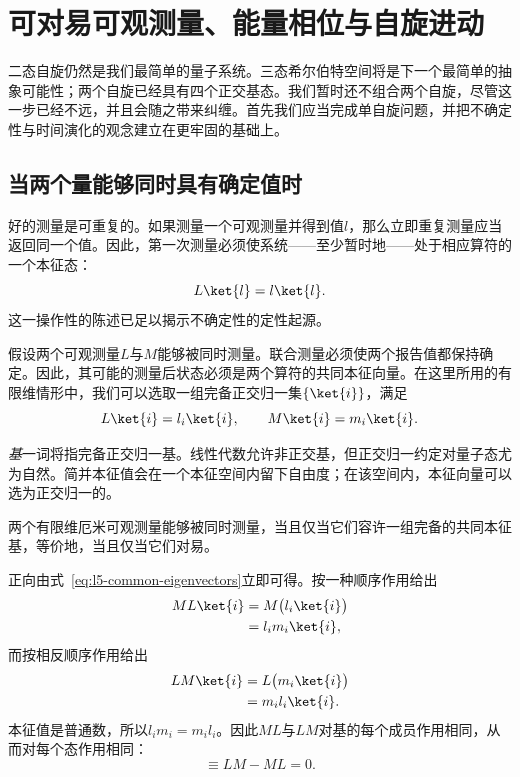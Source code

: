 \chapter{可对易可观测量、能量相位与自旋进动}


二态自旋仍然是我们最简单的量子系统。三态希尔伯特空间将是下一个最简单的抽象可能性；两个自旋已经具有四个正交基态。我们暂时还不组合两个自旋，尽管这一步已经不远，并且会随之带来纠缠。首先我们应当完成单自旋问题，并把不确定性与时间演化的观念建立在更牢固的基础上。

\section{当两个量能够同时具有确定值时}

好的测量是可重复的。如果测量一个可观测量并得到值\(l\)，那么立即重复测量应当返回同一个值。因此，第一次测量必须使系统——至少暂时地——处于相应算符的一个本征态：
\begin{equation}
L\ket{l}=l\ket{l}.
\end{equation}
这一操作性的陈述已足以揭示不确定性的定性起源。

假设两个可观测量\(L\)与\(M\)能够被同时测量。联合测量必须使两个报告值都保持确定。因此，其可能的测量后状态必须是两个算符的共同本征向量。在这里所用的有限维情形中，我们可以选取一组完备正交归一集\(\{\ket{i}\}\)，满足
\begin{equation}
L\ket{i}=l_i\ket{i},
\qquad
M\ket{i}=m_i\ket{i}.
\label{eq:l5-common-eigenvectors}
\end{equation}

\begin{remark}
\emph{基}一词将指完备正交归一基。线性代数允许非正交基，但正交归一约定对量子态尤为自然。简并本征值会在一个本征空间内留下自由度；在该空间内，本征向量可以选为正交归一的。
\end{remark}

\begin{theorem}
两个有限维厄米可观测量能够被同时测量，当且仅当它们容许一组完备的共同本征基，等价地，当且仅当它们对易。
\end{theorem}

正向由式~\eqref{eq:l5-common-eigenvectors}立即可得。按一种顺序作用给出
\begin{align}
ML\ket{i}
&=M\bigl(l_i\ket{i}\bigr)\\
&=l_i m_i\ket{i},
\end{align}
而按相反顺序作用给出
\begin{align}
LM\ket{i}
&=L\bigl(m_i\ket{i}\bigr)\\
&=m_i l_i\ket{i}.
\end{align}
本征值是普通数，所以\(l_i m_i=m_i l_i\)。因此\(ML\)与\(LM\)对基的每个成员作用相同，从而对每个态作用相同：
\begin{equation}
[L,M]\equiv LM-ML=0.
\label{eq:l5-commuting-condition}
\end{equation}

